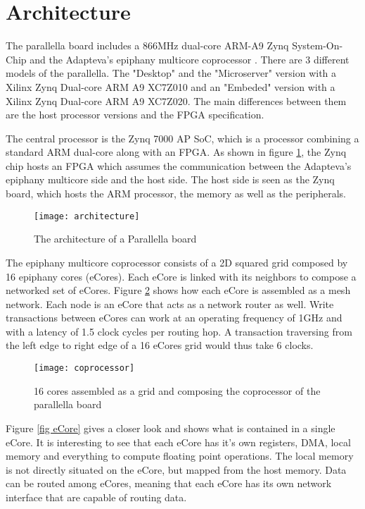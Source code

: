 \section{Architecture} \label{architecture}
The parallella board includes a 866MHz dual-core ARM-A9 Zynq System-On-Chip and the Adapteva's \gls{epiphany} multicore coprocessor \cite{parallellamanual}. There are 3 different models of the parallella. The "Desktop" and the "Microserver" version with a Xilinx Zynq Dual-core ARM A9 XC7Z010 and an "Embeded" version with a Xilinx Zynq Dual-core ARM A9 XC7Z020. The main differences between them are the host processor versions and the \gls{FPGA} specification. 

The central processor is the Zynq 7000 AP SoC, which is a processor combining a standard ARM dual-core along with an \gls{FPGA}. As shown in figure \ref{fig architecture}, the Zynq chip hosts an \gls{FPGA} which assumes the communication between the Adapteva's \gls{epiphany} multicore side and the host side. The host side is seen as the Zynq board, which hosts the ARM processor, the memory as well as the peripherals.

\begin{figure}[h!]
\centering
\texttt{[image: architecture]}
\caption{The architecture of a Parallella board}
\label{fig architecture}
\end{figure}

The \gls{epiphany} multicore coprocessor consists of a 2D squared grid composed by 16 \gls{epiphany} cores (\glspl{eCore}). Each \gls{eCore} is linked with its neighbors to compose a networked set of \glspl{eCore}. Figure \ref{fig coprocessor} shows how each \gls{eCore} is assembled as a mesh network. Each node is an \gls{eCore} that acts as a network router as well. Write transactions between \glspl{eCore} can work at an operating frequency of 1GHz and with a latency of 1.5 clock cycles per routing hop\cite{epiphanyArch}. A transaction traversing from the left edge to right edge of a 16 \glspl{eCore} grid would thus take 6 clocks.

\begin{figure}[h!]
\centering
\texttt{[image: coprocessor]}
\caption{16 cores assembled as a grid and composing the coprocessor of the parallella board}
\label{fig coprocessor}
\end{figure}

Figure \ref{fig eCore} gives a closer look and shows what is contained in a single \gls{eCore}. It is interesting to see that each \gls{eCore} has it's own registers, \gls{DMA}, local memory and everything to compute floating point operations. The local memory is not directly situated on the \gls{eCore}, but mapped from the host memory\cite{parallellamanual}. Data can be routed among \glspl{eCore}, meaning that each \gls{eCore} has its own network interface that are capable of routing data.

